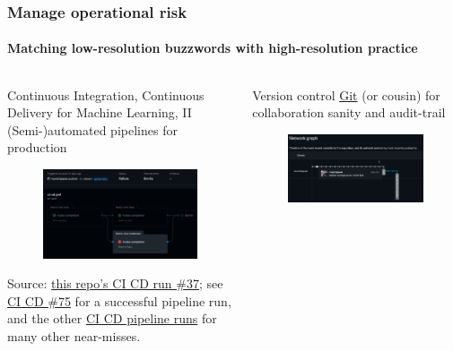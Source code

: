 \begin{frame}
    \frametitle{Manage operational risk}
    \framesubtitle{Matching low-resolution buzzwords with high-resolution practice}
    \begin{columns}[T]
        \begin{column}{0.48\textwidth}
            \begin{block}{Continuous Integration, Continuous Delivery for Machine Learning, II}
                (Semi-)automated pipelines for production
                \begin{figure}[ht]
                    \includegraphics[height=0.25\textheight]{graphics/non-simple-ci-cd-pipeline}
                \end{figure}
                Source: \href{https://github.com/munichpavel/risk-ai-workshop/actions/runs/2038526473}{this repo's CI CD run \#37}; see \href{https://github.com/munichpavel/risk-ai-workshop/actions/runs/2084303272}{CI CD \#75} for a successful pipeline run, and the other \href{https://github.com/munichpavel/risk-ai-workshop/actions}{CI CD pipeline runs} for many other near-misses.
            \end{block}
        \end{column}
        \begin{column}{0.48\textwidth}
            \begin{block}{Version control}
                \href{https://git-scm.com/doc}{Git} (or cousin) for collaboration sanity and audit-trail
                \begin{figure}[ht]
                    \includegraphics[height=0.25\textheight]{graphics/git-network-commit-graph}

\end{figure}
\end{block}
\end{column}
\end{columns}
\end{frame}
